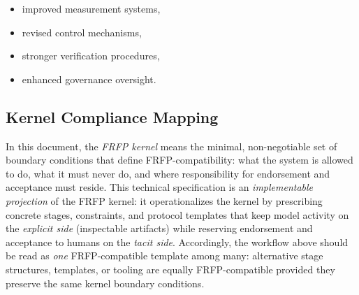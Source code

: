 \begin{itemize}
\item improved measurement systems,
\item revised control mechanisms,
\item stronger verification procedures,
\item enhanced governance oversight.
\end{itemize}

\subsection*{Kernel Compliance Mapping}
In this document, the \emph{FRFP kernel} means the minimal, non-negotiable set of boundary conditions that
define FRFP-compatibility: what the system is allowed to do, what it must never do, and where responsibility
for endorsement and acceptance must reside. This technical specification is an \emph{implementable projection} of the FRFP kernel: it operationalizes the
kernel by prescribing concrete stages, constraints, and protocol templates that keep model activity on the
\emph{explicit side} (inspectable artifacts) while reserving endorsement and acceptance to humans on the
\emph{tacit side}. Accordingly, the workflow above should be read as \emph{one} FRFP-compatible template among
many: alternative stage structures, templates, or tooling are equally FRFP-compatible provided they preserve
the same kernel boundary conditions.

